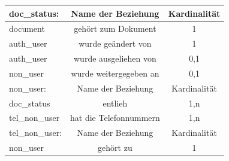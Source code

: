 \begin{tabular}[ht]{|l||c|c|}
  doc\_status: & Name der Beziehung & Kardinalität\\
  \hline\hline
  document & gehört zum Dokument & 1\\
  \hline
  auth\_user & wurde geändert von & 1\\
  \hline
  auth\_user & wurde ausgeliehen von & 0,1\\
  \hline
  non\_user & wurde weitergegeben an & 0,1\\
  \hline\hline\hline
  
  non\_user: & Name der Beziehung & Kardinalität\\
  \hline\hline
  doc\_status & entlieh & 1,n\\
  \hline
  tel\_non\_user & hat die Telefonnummern & 1,n\\
  \hline\hline\hline
  
  tel\_non\_user:  & Name der Beziehung &  Kardinalit\"at\\
  \hline\hline
  non\_user & gehört zu & 1 \\
  \hline
\end{tabular}


